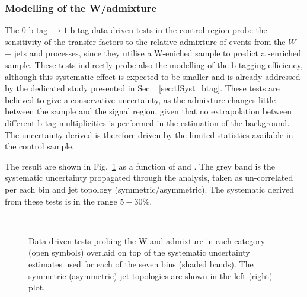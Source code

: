 \subsubsection*{Modelling of the W/\ttbar admixture}
\label{sec:tfSyst_WttAd}
The $0$ b-tag $\rightarrow1$ b-tag data-driven tests in the \mj control region 
probe the sensitivity of the transfer factors to the relative
admixture of events from the $W$ + jets and \ttbar processes, 
since they utilise a W-eniched sample to predict a \ttbar-enriched sample. 
These tests indirectly probe also the modelling of the b-tagging efficiency, 
although this systematic effect is expected to be smaller and is already addressed 
by the dedicated study presented in Sec. ~\ref{sec:tfSyst_btag}.
These tests are believed to give a conservative uncertainty, 
as the admixture changes little between the \mj sample and the signal region, 
given that no extrapolation between different b-tag multiplicities is performed 
in the estimation of the background. 
The uncertainty derived is therefore driven by the limited statistics available in the control sample. 

The result are shown in Fig.~\ref{fig:closureBTag} as a function of \scalht and \njet. 
The grey band is the systematic uncertainty propagated through the analysis, 
taken as un-correlated per each \scalht bin and jet topology (symmetric/asymmetric). The systematic derived from these tests is
in the range $5-30\%$.

\begin{figure}[h!]
  \begin{center}
    ~~
    \caption{Data-driven tests probing the W and \ttbar admixture 
      in each \njet category (open symbols) overlaid on top of the systematic
      uncertainty estimates used for each of the seven \scalht bins
      (shaded bands). 
      The symmetric (asymmetric) jet topologies are shown in the left (right) plot.      
    }
    \label{fig:closureBTag}
  \end{center} 
\end{figure}


